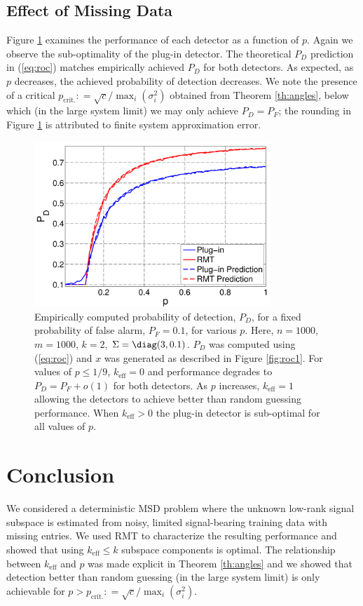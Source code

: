 \subsection{Effect of Missing Data}
Figure \ref{fig:sparsity} examines the performance of each detector as a function of $p$. Again we observe the sub-optimality of the plug-in detector. The theoretical $P_D$ prediction in (\ref{eq:roc}) matches empirically achieved $P_D$ for both detectors. As expected, as $p$ decreases, the achieved probability of detection decreases. We note the presence of a critical $p_{\text{crit.}} : = \sqrt{c}/\max_{i}(\sigma_{i}^{2})$ obtained from Theorem \ref{th:angles}, below which (in the large system limit) we may only achieve $P_D=P_F$; the rounding in Figure \ref{fig:sparsity} is attributed to finite system approximation error.

\begin{figure}[t]
\centering
\includegraphics[width=3.5in]{figures/sparsity.pdf}
\caption{Empirically computed probability of detection, $P_D$, for a fixed probability of false alarm, $P_F=0.1$, for various $p$. Here, $n=1000$, $m=1000$, $k=2$, $\Sigma=\diag(3,0.1)$. $P_D$ was computed using (\ref{eq:roc}) and $x$ was generated as described in Figure \ref{fig:roc1}. For values of $p \leq 1/9$, $k_\text{eff}=0$ and performance degrades to $P_D = P_F +o(1)$ for both detectors. As $p$ increases, $k_\text{eff}=1$ allowing the detectors to achieve better than random guessing performance. When $k_\text{eff}>0$ the plug-in detector is sub-optimal for all values of $p$.}\vskip-0.45cm
\label{fig:sparsity}
\end{figure}

\section{Conclusion}\label{sec:conclusion}

We considered a deterministic MSD problem where the unknown low-rank signal subspace is estimated from noisy, limited signal-bearing training data with missing entries.  We used RMT to characterize the resulting performance and showed that using $k_\text{eff} \leq k$ subspace components is optimal. The relationship between $k_{\text{eff}}$ and $p$ was made explicit in  Theorem \ref{th:angles} and we showed that detection better than random guessing (in the large system limit) is only achievable for $p > p_{\text{crit.}} : = \sqrt{c}/\max_{i}(\sigma_{i}^{2})$. 